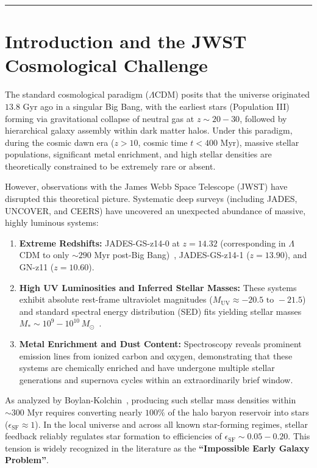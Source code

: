 \documentclass[11pt,a4paper]{article}
\begin{document}
\vspace{1em}
\hrule
\vspace{1.5em}

\section{Introduction and the JWST Cosmological Challenge}
\label{sec:intro}

The standard cosmological paradigm ($\Lambda$CDM) posits that the universe originated $13.8\text{ Gyr}$ ago in a singular Big Bang, with the earliest stars (Population III) forming via gravitational collapse of neutral gas at $z \sim 20-30$, followed by hierarchical galaxy assembly within dark matter halos. Under this paradigm, during the cosmic dawn era ($z > 10$, cosmic time $t < 400\text{ Myr}$), massive stellar populations, significant metal enrichment, and high stellar densities are theoretically constrained to be extremely rare or absent.

However, observations with the James Webb Space Telescope (JWST) have disrupted this theoretical picture. Systematic deep surveys (including JADES, UNCOVER, and CEERS) have uncovered an unexpected abundance of massive, highly luminous systems:
\begin{enumerate}
    \item \textbf{Extreme Redshifts:} JADES-GS-z14-0 at $z = 14.32$ (corresponding in $\Lambda$CDM to only $\sim 290\text{ Myr}$ post-Big Bang)~\cite{carniani2024}, JADES-GS-z14-1 ($z = 13.90$), and GN-z11 ($z = 10.60$).
    \item \textbf{High UV Luminosities and Inferred Stellar Masses:} These systems exhibit absolute rest-frame ultraviolet magnitudes ($M_{\mathrm{UV}} \approx -20.5\text{ to } -21.5$) and standard spectral energy distribution (SED) fits yielding stellar masses $M_* \sim 10^9 - 10^{10}\,M_\odot$~\cite{labbe2023}.
    \item \textbf{Metal Enrichment and Dust Content:} Spectroscopy reveals prominent emission lines from ionized carbon and oxygen, demonstrating that these systems are chemically enriched and have undergone multiple stellar generations and supernova cycles within an extraordinarily brief window.
\end{enumerate}

As analyzed by Boylan-Kolchin~\cite{boylan2023}, producing such stellar mass densities within $\sim 300\text{ Myr}$ requires converting nearly $100\%$ of the halo baryon reservoir into stars ($\epsilon_{\mathrm{SF}} \approx 1$). In the local universe and across all known star-forming regimes, stellar feedback reliably regulates star formation to efficiencies of $\epsilon_{\mathrm{SF}} \sim 0.05 - 0.20$. This tension is widely recognized in the literature as the \textbf{``Impossible Early Galaxy Problem''}.
\end{document}
